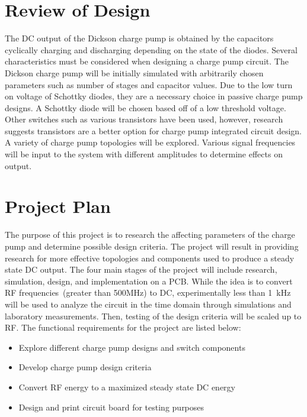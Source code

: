 \documentclass[12pt]{article}
\begin{document}
	\section{Review of Design}
	The DC output of the Dickson charge pump is obtained by the capacitors cyclically charging and discharging depending on the state of the diodes. Several characteristics must be considered when designing a charge pump circuit. The Dickson charge pump will be initially simulated with arbitrarily chosen parameters such as number of stages and capacitor values. Due to the low turn on voltage of Schottky diodes, they are a necessary choice in passive charge pump designs. A Schottky diode will be chosen based off of a low threshold voltage. Other switches such as various transistors have been used, however, research suggests transistors are a better option for charge pump integrated circuit design. A variety of charge pump topologies will be explored. Various signal frequencies will be input to the system with different amplitudes to determine effects on output.

	\section{Project Plan}
	The purpose of this project is to research the affecting parameters of the charge pump and determine possible design criteria. The project will result in providing research for more effective topologies and components used to produce a steady state DC output. The four main stages of the project will include research, simulation, design, and implementation on a PCB. While the idea is to convert RF frequencies~(greater than 500MHz) to DC, experimentally less than 1~kHz will be used to analyze the circuit in the time domain through simulations and laboratory measurements. Then, testing of the design criteria will be scaled up to RF. The functional requirements for the project are listed below:\\
	
\begin{itemize}
	\item Explore different charge pump designs and switch components
	\item Develop charge pump design criteria
	\item Convert RF energy to a maximized steady state DC energy
	\item Design and print circuit board for testing purposes
\end{itemize}
	
\end{document}
